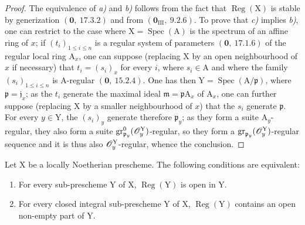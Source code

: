 \begin{proof}
The equivalence of \emph{a)} and \emph{b)} follows from the fact that $\operatorname{Reg}(\mathrm{X})$ is stable by generization
$(\mathbf{0},~17.3.2)$ and from $(\mathbf{0}_{\mathrm{III}},~9.2.6)$. To prove that \emph{c)} implies \emph{b)}, one can restrict to the
case where $\mathrm{X}=\operatorname{Spec}(\mathrm{A})$ is the spectrum of an affine ring of $x$; if $(t_i)_{1\leqslant i\leqslant n}$ is a regular
system of parameters $(\mathbf{0},~17.1.6)$ of the regular local ring $\mathrm{A}_x$, one can suppose
(replacing $\mathrm{X}$ by an open neighbourhood of $x$ if necessary) that $t_i=(s_i)_x$ for every $i$,
where $s_i\in\mathrm{A}$ and where the family $(s_i)_{1\leqslant i\leqslant n}$ is $\mathrm{A}$-regular $(\mathbf{0},~15.2.4)$. One has then $\mathrm{Y}=\operatorname{Spec}(\mathrm{A}/\mathfrak{p})$,
where $\mathfrak{p}=\mathfrak{j}_x$; as the $t_i$ generate the maximal ideal $\mathfrak{m}=\mathfrak{p}\mathrm{A}_x$ of $\mathrm{A}_x$, one can further
suppose (replacing $\mathrm{X}$ by a smaller neighbourhood of $x$) that the $s_i$ generate $\mathfrak{p}$.
For every $y\in\mathrm{Y}$, the $(s_i)_y$ generate therefore $\mathfrak{p}_y$; as they form a suite $\mathrm{A}_y$-regular,
they also form a suite $\operatorname{gr}^0_{\mathfrak{p}_y}(\mathscr{O}^{\mathrm{Y}}_y)$-regular, so they form a
$\operatorname{gr}_{\mathfrak{p}_y}(\mathscr{O}^{\mathrm{Y}}_y)$-regular sequence and it is thus also $\mathscr{O}^{\mathrm{Y}}_y$-regular,
whence the conclusion.
\end{proof}

\begin{corollary}[6.12.3]
\label{IV.6.12.3}
Let $\mathrm{X}$ be a locally Noetherian prescheme. The following conditions
are equivalent:
\begin{enumerate}[label=\emph{\alph*)}]
  \item For every sub-prescheme $\mathrm{Y}$ of $\mathrm{X}$, $\operatorname{Reg}(\mathrm{Y})$ is open in $\mathrm{Y}$.
  \item For every closed integral sub-prescheme $\mathrm{Y}$ of $\mathrm{X}$, $\operatorname{Reg}(\mathrm{Y})$ contains an open non-empty
part of $\mathrm{Y}$.
\end{enumerate}
\end{corollary}


